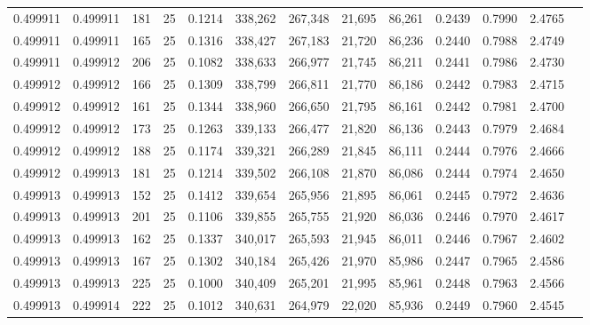 \begin{tabular}{rrrrrrrrrrrrr}
0.499911 & 0.499911 &   181 &  25 &                                     0.1214 & 338,262 & 267,348 &  21,695 &  86,261 & 0.2439 & 0.7990 & 2.4765 \\
0.499911 & 0.499911 &   165 &  25 &                                     0.1316 & 338,427 & 267,183 &  21,720 &  86,236 & 0.2440 & 0.7988 & 2.4749 \\
0.499911 & 0.499912 &   206 &  25 &                                     0.1082 & 338,633 & 266,977 &  21,745 &  86,211 & 0.2441 & 0.7986 & 2.4730 \\
0.499912 & 0.499912 &   166 &  25 &                                     0.1309 & 338,799 & 266,811 &  21,770 &  86,186 & 0.2442 & 0.7983 & 2.4715 \\
0.499912 & 0.499912 &   161 &  25 &                                     0.1344 & 338,960 & 266,650 &  21,795 &  86,161 & 0.2442 & 0.7981 & 2.4700 \\
0.499912 & 0.499912 &   173 &  25 &                                     0.1263 & 339,133 & 266,477 &  21,820 &  86,136 & 0.2443 & 0.7979 & 2.4684 \\
0.499912 & 0.499912 &   188 &  25 &                                     0.1174 & 339,321 & 266,289 &  21,845 &  86,111 & 0.2444 & 0.7976 & 2.4666 \\
0.499912 & 0.499913 &   181 &  25 &                                     0.1214 & 339,502 & 266,108 &  21,870 &  86,086 & 0.2444 & 0.7974 & 2.4650 \\
0.499913 & 0.499913 &   152 &  25 &                                     0.1412 & 339,654 & 265,956 &  21,895 &  86,061 & 0.2445 & 0.7972 & 2.4636 \\
0.499913 & 0.499913 &   201 &  25 &                                     0.1106 & 339,855 & 265,755 &  21,920 &  86,036 & 0.2446 & 0.7970 & 2.4617 \\
0.499913 & 0.499913 &   162 &  25 &                                     0.1337 & 340,017 & 265,593 &  21,945 &  86,011 & 0.2446 & 0.7967 & 2.4602 \\
0.499913 & 0.499913 &   167 &  25 &                                     0.1302 & 340,184 & 265,426 &  21,970 &  85,986 & 0.2447 & 0.7965 & 2.4586 \\
0.499913 & 0.499913 &   225 &  25 &                                     0.1000 & 340,409 & 265,201 &  21,995 &  85,961 & 0.2448 & 0.7963 & 2.4566 \\
0.499913 & 0.499914 &   222 &  25 &                                     0.1012 & 340,631 & 264,979 &  22,020 &  85,936 & 0.2449 & 0.7960 & 2.4545 \\

\end{tabular}

